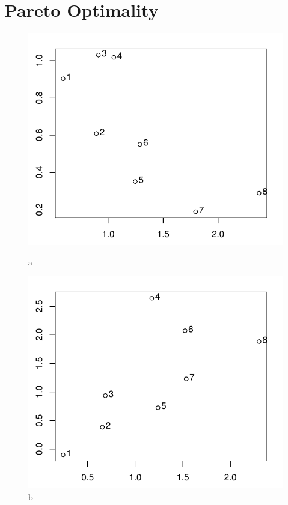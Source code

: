\section{Pareto Optimality}
\begin{figure}[H]
  \centering
  \begin{minipage}[b]{0.45\textwidth}
    \includegraphics[width=\textwidth]{front_points_1.pdf}
    \caption{a}
  \end{minipage}
  \hfill
  \begin{minipage}[b]{0.45\textwidth}
    \includegraphics[width=\textwidth]{front_points_2.pdf}
    \caption{b}
  \end{minipage}
\end{figure}


